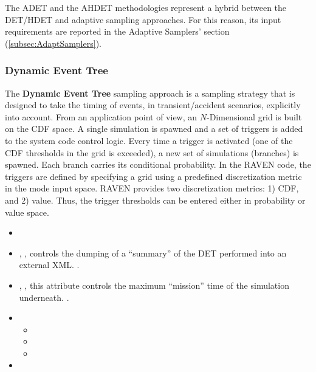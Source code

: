 The ADET and the AHDET methodologies represent a hybrid between the DET/HDET and adaptive sampling
approaches.
%
For this reason, its input requirements are reported in the Adaptive Samplers'
section (\ref{subsec:AdaptSamplers}).

\subsubsection{Dynamic Event Tree}
\label{subsubsubsec:DET}
The \textbf{Dynamic Event Tree} sampling approach is a sampling strategy that is
designed to take the timing of events, in transient/accident scenarios,
explicitly into account.
%
From an application point of view, an $N$-Dimensional grid is built on the CDF
space.
%
A single simulation is spawned and a set of triggers is added to the system code
control logic.
%
Every time a trigger is activated (one of the CDF thresholds in the grid is
exceeded), a new set of simulations (branches) is spawned.
%
Each branch carries its conditional probability.
%
In the RAVEN code, the triggers are defined by specifying a grid using a
predefined discretization metric in the mode input space.
%
RAVEN provides two discretization metrics: 1) CDF, and 2) value.
%
Thus, the trigger thresholds can be entered either in probability or value
space.
%

%
\attrsIntro
\begin{itemize}
  \itemsep0em
  \item \nameDescription
  \item {}, ,
    controls the dumping of a ``summary'' of the DET performed into an external
    XML.
    .
  \item {}, , this
    attribute controls the maximum ``mission'' time of the simulation
    underneath.
    .
\end{itemize}
\begin{itemize}
\item \variableDescription
  \variableChildrenIntro
  \begin{itemize}
    \item \distributionDescription
    \item \functionDescription
    \item \gridDescription
  \end{itemize}
  \item \constantVariablesDescription
\end{itemize}

